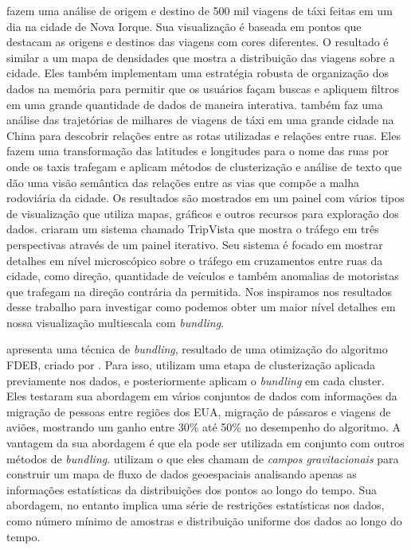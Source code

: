 \citet{Ferreira2013} fazem uma análise de origem e destino de 500 mil viagens
de táxi feitas em um dia na cidade de Nova Iorque. Sua visualização é baseada
em pontos que destacam as origens e destinos das viagens com cores diferentes.
O resultado é similar a um mapa de densidades que mostra a distribuição das
viagens sobre a cidade. Eles também implementam uma estratégia robusta de
organização dos dados na memória para permitir que os usuários façam buscas e
apliquem filtros em uma grande quantidade de dados de maneira interativa.
\citet{Chu2014} também faz uma análise das trajetórias de milhares de viagens
de táxi em uma grande cidade na China para descobrir relações entre as rotas
utilizadas e relações entre ruas. Eles fazem uma transformação das latitudes e
longitudes para o nome das ruas por onde os taxis trafegam e aplicam métodos de
clusterização e análise de texto que dão uma visão semântica das relações entre
as vias que compõe a malha rodoviária da cidade. Os resultados são mostrados em
um painel com vários tipos de visualização que utiliza mapas, gráficos e outros
recursos para exploração dos dados. \citet{Guo2011} criaram um sistema chamado
TripVista que mostra o tráfego em três perspectivas através de um painel
iterativo.  Seu sistema é focado em mostrar detalhes em nível microscópico
sobre o tráfego em cruzamentos entre ruas da cidade, como direção, quantidade
de veículos e também anomalias de motoristas que trafegam na direção contrária
da permitida. Nos inspiramos nos resultados desse trabalho para investigar como
podemos obter um maior nível detalhes em nossa visualização multiescala com
\emph{bundling}.

\citet{Anita2017} apresenta uma técnica de \emph{bundling}, resultado de uma
otimização do algoritmo FDEB, criado por \citet{Selassie2011}. Para isso,
utilizam uma etapa de clusterização aplicada previamente nos dados, e
posteriormente aplicam o \emph{bundling} em cada cluster. Eles testaram sua
abordagem em vários conjuntos de dados com informações da migração de pessoas
entre regiões dos EUA, migração de pássaros e viagens de aviões, mostrando um
ganho entre 30\% até 50\% no desempenho do algoritmo. A vantagem da sua
abordagem é que ela pode ser utilizada em conjunto com outros métodos de
\emph{bundling}. \citet{Kim2018} utilizam o que eles chamam de \emph{campos
gravitacionais} para construir um mapa de fluxo de dados geoespaciais
analisando apenas as informações estatísticas da distribuições dos pontos ao
longo do tempo. Sua abordagem, no entanto implica uma série de restrições
estatísticas nos dados, como número mínimo de amostras e distribuição uniforme
dos dados ao longo do tempo.

